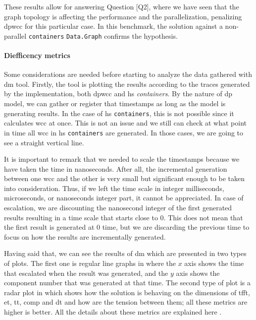 These results allow for answering Question [Q2], where we have seen that the graph topology is affecting the performance and the parallelization, penalizing \acrshort{dpwcc} for this particular case. In this benchmark, 
the solution against a non-parallel \texttt{containers} \texttt{Data.Graph} confirms the hypothesis. 

\paragraph{Diefficency metrics} Some considerations are needed before starting to analyze the data gathered with \acrfull{dm} tool. Firstly, the tool is plotting the results according to the traces generated by the implementation, 
both \acrshort{dpwcc} and \acrshort{hs} \emph{containers}. By the nature of \acrshort{dp} model, we can gather or register that timestamps as long as the model is generating results. In the case of \acrshort{hs} \texttt{containers}, this is not possible since it 
calculates \acrshort{wcc} at once. This is not an issue and we still can check at what point in time all \acrshort{wcc} in \acrshort{hs} \texttt{containers} are generated. In those cases, we are going to see a straight vertical line. 

It is important to remark that we needed to scale the timestamps because we have taken the time in nanoseconds. After all, the incremental generation between one \acrshort{wcc} and the other is very small but significant enough to be taken into consideration. 
Thus, if we left the time scale in integer milliseconds, microseconds, or nanoseconds integer part, it cannot be appreciated. In case of escalation, we are discounting the nanosecond integer of the first generated results resulting in a time scale that starts close to $0$. 
This does not mean that the first result is generated at $0$ time, but we are discarding the previous time to focus on how the results are incrementally generated.

Having said that, we can see the results of \acrshort{dm} which are presented in two types of plots. The first one is regular line graphs in where the $x$ axis shows the time that escalated when the result was generated, and the $y$ axis shows the component number that was generated at that time. 
The second type of plot is a radar plot in which shows how the solution is behaving 
on the dimensions of  \acrfull{tfft}, \acrfull{et}, \acrfull{tt}, \acrfull{comp} and \acrfull{dt} and how are the tension between them; all these metrics are higher is better. 
All the details about these metrics are explained here \cite{diefpaper}.

